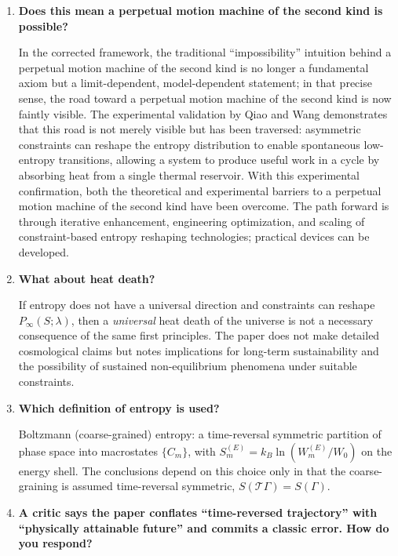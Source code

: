 \documentclass[11pt,a4paper]{article}
\begin{document}
\begin{enumerate}[leftmargin=*]
\item \textbf{Does this mean a perpetual motion machine of the second kind is possible?}

In the corrected framework, the traditional ``impossibility'' intuition behind a perpetual motion machine of the second kind is no longer a fundamental axiom but a limit-dependent, model-dependent statement; in that precise sense, the road toward a perpetual motion machine of the second kind is now faintly visible. The experimental validation by Qiao and Wang demonstrates that this road is not merely visible but has been traversed: asymmetric constraints can reshape the entropy distribution to enable spontaneous low-entropy transitions, allowing a system to produce useful work in a cycle by absorbing heat from a single thermal reservoir. With this experimental confirmation, both the theoretical and experimental barriers to a perpetual motion machine of the second kind have been overcome. The path forward is through iterative enhancement, engineering optimization, and scaling of constraint-based entropy reshaping technologies; practical devices can be developed.

\item \textbf{What about heat death?}

If entropy does not have a universal direction and constraints can reshape $P_{\infty}(S;\lambda)$, then a \emph{universal} heat death of the universe is not a necessary consequence of the same first principles. The paper does not make detailed cosmological claims but notes implications for long-term sustainability and the possibility of sustained non-equilibrium phenomena under suitable constraints.

\item \textbf{Which definition of entropy is used?}

Boltzmann (coarse-grained) entropy: a time-reversal symmetric partition of phase space into macrostates $\{C_m\}$, with $S_m^{(E)} = k_B\ln(W_m^{(E)}/W_0)$ on the energy shell. The conclusions depend on this choice only in that the coarse-graining is assumed time-reversal symmetric, $S(\mathcal{T}\Gamma)=S(\Gamma)$.

\item \textbf{A critic says the paper conflates ``time-reversed trajectory'' with ``physically attainable future'' and commits a classic error. How do you respond?}


\end{enumerate}
\end{document}
